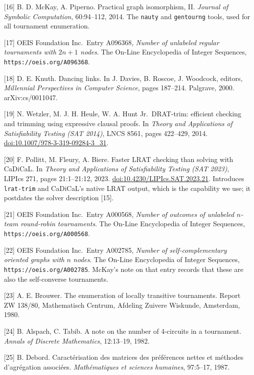 \documentclass[
]{article}
\begin{document}
{[}16{]} B. D. McKay, A. Piperno. Practical graph isomorphism, II.
\emph{Journal of Symbolic Computation}, 60:94--112, 2014. The
\texttt{nauty} and \texttt{gentourng} tools, used for all tournament
enumeration.

{[}17{]} OEIS Foundation Inc.~Entry A096368, \emph{Number of unlabeled
regular tournaments with \(2n+1\) nodes}. The On-Line Encyclopedia of
Integer Sequences, \texttt{https://oeis.org/A096368}.

{[}18{]} D. E. Knuth. Dancing links. In J. Davies, B. Roscoe, J.
Woodcock, editors, \emph{Millennial Perspectives in Computer Science},
pages 187--214. Palgrave, 2000. arXiv:cs/0011047.

{[}19{]} N. Wetzler, M. J. H. Heule, W. A. Hunt Jr.~DRAT-trim: efficient
checking and trimming using expressive clausal proofs. In \emph{Theory
and Applications of Satisfiability Testing (SAT 2014)}, LNCS 8561, pages
422--429, 2014. \url{doi:10.1007/978-3-319-09284-3_31}.

{[}20{]} F. Pollitt, M. Fleury, A. Biere. Faster LRAT checking than
solving with CaDiCaL. In \emph{Theory and Applications of Satisfiability
Testing (SAT 2023)}, LIPIcs 271, pages 21:1--21:12, 2023.
\url{doi:10.4230/LIPIcs.SAT.2023.21}. Introduces \texttt{lrat-trim} and
CaDiCaL's native LRAT output, which is the capability we use; it
postdates the solver description {[}15{]}.

{[}21{]} OEIS Foundation Inc.~Entry A000568, \emph{Number of outcomes of
unlabeled \(n\)-team round-robin tournaments}. The On-Line Encyclopedia
of Integer Sequences, \texttt{https://oeis.org/A000568}.

{[}22{]} OEIS Foundation Inc.~Entry A002785, \emph{Number of
self-complementary oriented graphs with \(n\) nodes}. The On-Line
Encyclopedia of Integer Sequences, \texttt{https://oeis.org/A002785}.
McKay's note on that entry records that these are also the self-converse
tournaments.

{[}23{]} A. E. Brouwer. The enumeration of locally transitive
tournaments. Report ZW 138/80, Mathematisch Centrum, Afdeling Zuivere
Wiskunde, Amsterdam, 1980.

{[}24{]} B. Alspach, C. Tabib. A note on the number of 4-circuits in a
tournament. \emph{Annals of Discrete Mathematics}, 12:13--19, 1982.

{[}25{]} B. Debord. Caractérisation des matrices des préférences nettes
et méthodes d'agrégation associées. \emph{Mathématiques et sciences
humaines}, 97:5--17, 1987.
\end{document}
